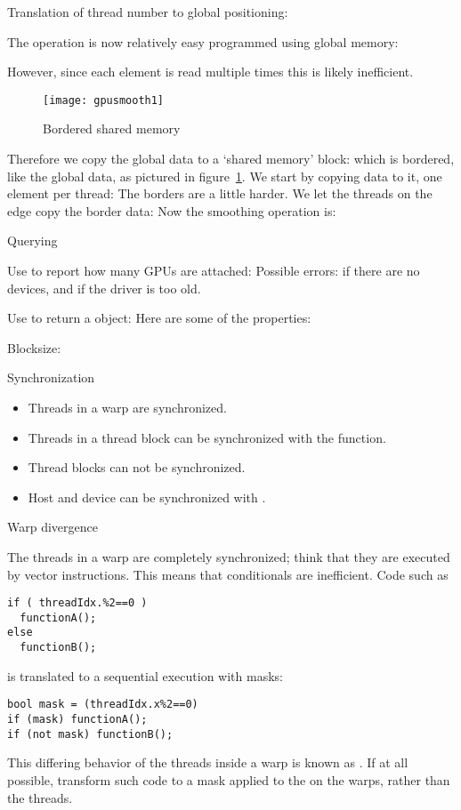 Translation of thread number to global positioning:

The operation is now relatively easy programmed using global memory:

However, since each element is read multiple times this is likely inefficient.
\begin{figure}[ht]
  \texttt{[image: gpusmooth1]}
  \caption{Bordered shared memory}
  \label{fig:cusmooth1}
\end{figure}
Therefore we copy the global data to a `shared memory' block:
which is bordered, like the global data,
as pictured in figure~\ref{fig:cusmooth1}.
We start by copying data to it, one element per thread:
The borders are a little harder. We let the threads on the edge
copy the border data:
Now the smoothing operation is:

 {Querying}
\label{sec:cu-properties}

Use  to report how many \acp{GPU} are attached:
Possible errors:  if there are no devices,
and  if the driver is too old.

Use 
to return a  object:
Here are some of the properties:

Blocksize:

 {Synchronization}

\begin{itemize}
\item Threads in a warp are synchronized.
\item Threads in a thread block can be synchronized
  with the  function.
\item Thread blocks can not be synchronized.
\item Host and device can be synchronized
  with .
\end{itemize}

 {Warp divergence}

The threads in a warp are completely synchronized;
think that they are executed by vector instructions.
This means that conditionals are inefficient.
Code such as
\begin{lstlisting}
if ( threadIdx.%2==0 )
  functionA();
else
  functionB();
\end{lstlisting}
is translated to a sequential execution with masks:
\begin{lstlisting}
bool mask = (threadIdx.x%2==0)
if (mask) functionA();
if (not mask) functionB();
\end{lstlisting}
This differing behavior of the threads inside a warp is known as
.
If at all possible, transform such code
to a mask applied to the on the warps,
rather than the threads.

